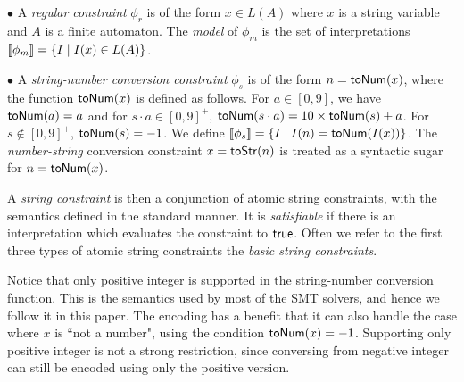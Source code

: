 \documentclass[sigplan,review,anonymous]{acmart}\settopmatter{printfolios=true,printccs=false,printacmref=false}
\begin{document}
$\bullet$ A \emph{regular constraint} $\phi_r$ is of the form $x \in L(A)$ where $x$ is a string variable and $A$ is a finite automaton. The \emph{model} of $\phi_m$ is the set of interpretations $[\![\phi_m]\!]=\{I\mid 
I(x) \in L(A) \}$. 
\smallskip

$\bullet$ A \emph{string-number conversion constraint} $\phi_s$ is of the form $n=\mbox{\textsf{toNum}($x$)}$, where the function $\mbox{\textsf{toNum}($x$)}$ is defined as follows. For $a\in [0,9]$, we have $\mbox{\textsf{toNum}($a$)}=a$ and for $s \cdot a \in [0,9]^+$, $\mbox{\textsf{toNum}($s\cdot a$)} = 10\times \mbox{\textsf{toNum}($s$)}+a$. For $s\notin [0,9]^+$, $\mbox{\textsf{toNum}($s$)}=-1$. We define $[\![\phi_s]\!]= \{I \mid I(n)= \mbox{\textsf{toNum}($I(x)$)} \}$. The \emph{number-string} conversion constraint $x=\mbox{\textsf{toStr}($n$)}$ is treated as a syntactic sugar for $n=\mbox{\textsf{toNum}($x$)}$.
\smallskip

A \emph{string constraint} is then a conjunction of atomic string constraints, with the semantics defined in the standard manner. It is \emph{satisfiable} if there is an interpretation which evaluates the  constraint to $\mbox{$\mathsf{true}$}$. Often we refer to the first three types of atomic string constraints the \emph{basic string constraints}.

Notice that only positive integer is supported in the string-number conversion function. This is the semantics used by most of the SMT solvers, and hence we follow it in this paper. The encoding has a benefit that it can also handle the case where $x$ is ``not a number", using the condition $\mbox{\textsf{toNum}($x$)} = -1$.
Supporting only positive integer is not a strong restriction, since conversing from negative integer can still be encoded using only the positive  version. 


\end{document}
